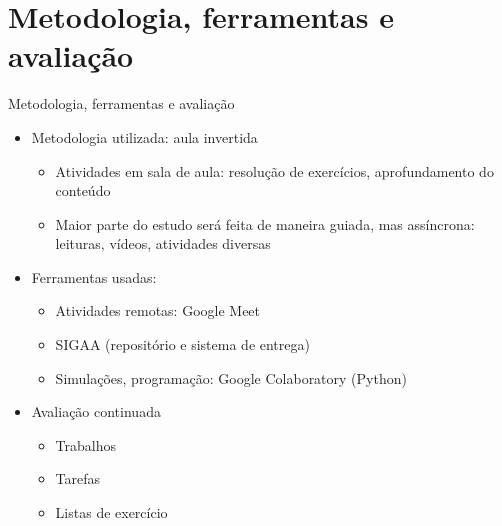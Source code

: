     \section[ slide = true]{Metodologia, ferramentas e avaliação}
      \begin{slide}[toc=]{Metodologia, ferramentas e avaliação}
         \begin{itemize}
	    \item Metodologia utilizada: aula invertida  
		    \begin{itemize}
			    \item Atividades em sala de aula: resolução de exercícios, aprofundamento do conteúdo
			    \item Maior parte do estudo será feita de maneira guiada, mas assíncrona: leituras, vídeos, atividades diversas
		    \end{itemize}
	    \item Ferramentas usadas:
		    \begin{itemize}
			    \item Atividades remotas: Google Meet %
			    \item SIGAA (repositório e sistema de entrega)
			    \item Simulações, programação: Google Colaboratory (Python)
		    \end{itemize}
            \item Avaliação continuada
            \begin{itemize}
               \item Trabalhos 
               \item Tarefas 
	       \item Listas de exercício
	    \end{itemize}
	 \end{itemize}
	 \end{slide}	  
